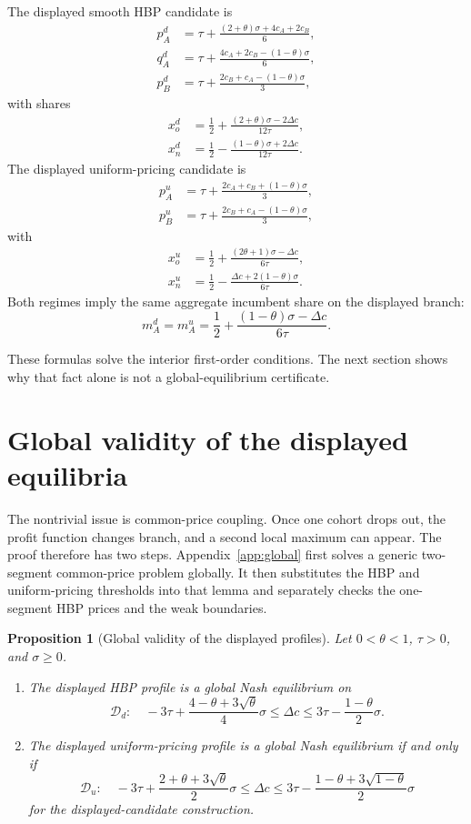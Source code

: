 \documentclass[11pt]{article}
\newtheorem{proposition}{Proposition}
\newcommand{\DC}{\Delta c}
\begin{document}
The displayed smooth HBP candidate is
\begin{align}
 p_A^d &=
 \tau+\frac{(2+\theta)\sigma+4c_A+2c_B}{6},\\
 q_A^d &=
 \tau+\frac{4c_A+2c_B-(1-\theta)\sigma}{6},\\
 p_B^d &=
 \tau+\frac{2c_B+c_A-(1-\theta)\sigma}{3},
\end{align}
with shares
\begin{align}
 x_o^d&=\frac12+\frac{(2+\theta)\sigma-2\DC}{12\tau},\\
 x_n^d&=\frac12-\frac{(1-\theta)\sigma+2\DC}{12\tau}.
\end{align}
The displayed uniform-pricing candidate is
\begin{align}
 p_A^u&=\tau+\frac{2c_A+c_B+(1-\theta)\sigma}{3},\\
 p_B^u&=\tau+\frac{2c_B+c_A-(1-\theta)\sigma}{3},
\end{align}
with
\begin{align}
 x_o^u&=\frac12+\frac{(2\theta+1)\sigma-\DC}{6\tau},\\
 x_n^u&=\frac12-\frac{\DC+2(1-\theta)\sigma}{6\tau}.
\end{align}
Both regimes imply the same aggregate incumbent share on the displayed branch:
\[
  m_A^d=m_A^u
  =\frac12+\frac{(1-\theta)\sigma-\DC}{6\tau}.
\]

These formulas solve the interior first-order conditions. The next section
shows why that fact alone is not a global-equilibrium certificate.

\section{Global validity of the displayed equilibria}

The nontrivial issue is common-price coupling. Once one cohort drops out, the
profit function changes branch, and a second local maximum can appear.  The
proof therefore has two steps.  Appendix~\ref{app:global} first solves a
generic two-segment common-price problem globally.  It then substitutes the
HBP and uniform-pricing thresholds into that lemma and separately checks the
one-segment HBP prices and the weak boundaries.

\begin{proposition}[Global validity of the displayed profiles]
\label{prop:validity}
Let $0<\theta<1$, $\tau>0$, and $\sigma\geq0$.

\begin{enumerate}
\item The displayed HBP profile is a global Nash equilibrium on
\[
\mathcal D_d:\quad
-3\tau+\frac{4-\theta+3\sqrt{\theta}}{4}\sigma
\leq \DC
\leq
3\tau-\frac{1-\theta}{2}\sigma.
\]

\item The displayed uniform-pricing profile is a global Nash equilibrium if and
only if
\[
\mathcal D_u:\quad
-3\tau+\frac{2+\theta+3\sqrt{\theta}}{2}\sigma
\leq \DC
\leq
3\tau-\frac{1-\theta+3\sqrt{1-\theta}}{2}\sigma
\]
for the displayed-candidate construction.
\end{enumerate}
\end{proposition}
\end{document}
